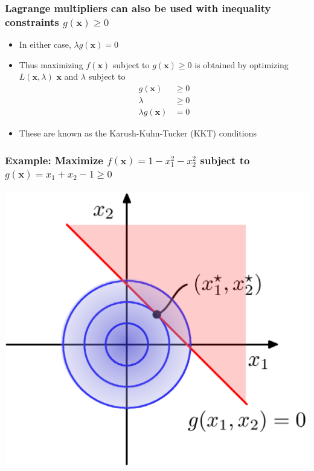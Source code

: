 \documentclass[12pt,notes,mathserif]{beamer}
\begin{document}
\begin{frame}[c]
\frametitle{Lagrange multipliers can also be used with inequality constraints $g(\mathbf{x})\geqslant{}0$}
\begin{itemize}
\item In either case, $\lambda g(\mathbf{x})=0$
\item Thus maximizing $f(\mathbf{x})$ subject to $g(\mathbf{x})\geqslant{}0$ is obtained by optimizing $L(\mathbf{x},\lambda)$ \wrt $\mathbf{x}$ and $\lambda$ subject to
\[
\begin{array}{cc}
g(\mathbf{x})&\geqslant{}0\\
\lambda&\geqslant{}0\\
\lambda g(\mathbf{x})&=0
\end{array}
\]
\item These are known as the Karush-Kuhn-Tucker (KKT) conditions
\end{itemize}
\end{frame}


\begin{frame}[c]
\frametitle{Example: Maximize $f(\mathbf{x})=1-x_1^2-x_2^2$ subject to $g(\mathbf{x})=x_1+x_2-1\geqslant{}0$}
\begin{center}
\includegraphics[width=0.65\linewidth]{fig8/lec835.jpg}
\end{center}
\end{frame}
\end{document}
